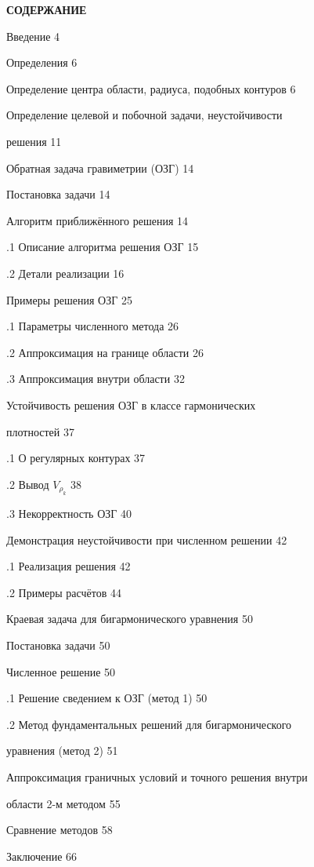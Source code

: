 ﻿\documentclass[a4paper]{article}
\begin{document}
\noindent \textbf{СОДЕРЖАНИЕ}

\noindent Введение            4

 Определения           6

 Определение центра области, радиуса, подобных контуров  6

 Определение целевой и побочной задачи, неустойчивости 

\noindent    решения                 11

 Обратная задача гравиметрии (ОЗГ)           14

 Постановка задачи              14

 Алгоритм приближённого решения           14

.1 Описание алгоритма решения ОЗГ          15

.2 Детали реализации             16

 Примеры решения ОЗГ             25

.1 Параметры численного метода           26

.2 Аппроксимация на границе области          26

.3 Аппроксимация внутри области           32

 Устойчивость решения ОЗГ в классе гармонических 

\noindent    плотностей                37

.1 О регулярных контурах            37

.2 Вывод $V_{{\rho }_k}$               38

.3 Некорректность ОЗГ             40

 Демонстрация неустойчивости при численном решении       42

.1 Реализация решения             42

.2 Примеры расчётов             44

 Краевая задача для бигармонического уравнения\textit{         }50

 Постановка задачи              50

 Численное решение              50

.1 Решение сведением к ОЗГ (метод 1)          50

.2 Метод фундаментальных решений для бигармонического   

\noindent         уравнения (метод 2)              51

 Аппроксимация граничных условий и точного решения внутри

\noindent    области 2-м методом                 55

 Сравнение методов              58

\noindent Заключение                66

\noindent 
\end{document}
